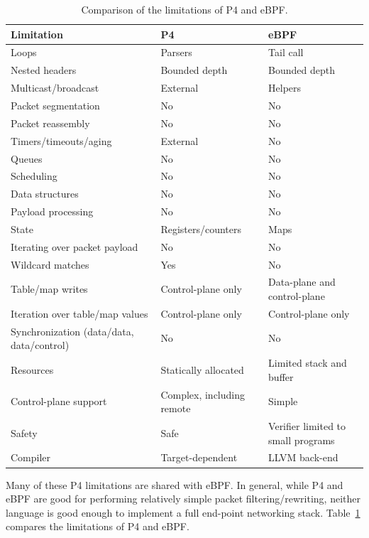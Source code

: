 \begin{table}[t]
  \footnotesize
  \begin{center}
  \begin{tabular}{|l|l|l|} \hline
    \textbf{Limitation} & \textbf{P4} & \textbf{eBPF} \\ \hline \hline
    Loops & Parsers & Tail call \\ \hline
    Nested headers & Bounded depth & Bounded depth \\ \hline
    Multicast/broadcast & External & Helpers \\ \hline
    Packet segmentation & No & No \\ \hline
    Packet reassembly &	No & No \\ \hline
    Timers/timeouts/aging & External & No \\ \hline
    Queues & No & No \\ \hline
    Scheduling & No & No \\ \hline
    Data structures & No & No \\ \hline
    Payload processing & No & No \\ \hline
    State & Registers/counters & Maps \\ \hline
    Iterating over packet payload & No & No \\ \hline
    Wildcard matches & Yes & No \\ \hline
    Table/map writes & Control-plane only & Data-plane and control-plane \\ \hline
    Iteration over table/map values & Control-plane only & Control-plane only \\ \hline
    Synchronization (data/data, data/control)  & No & No \\ \hline
    Resources & Statically allocated & Limited stack and buffer \\ \hline
    Control-plane support & Complex, including remote & Simple \\ \hline
    Safety & Safe & Verifier limited to small programs \\ \hline
    Compiler & Target-dependent & LLVM back-end \\ \hline
  \end{tabular}
  \caption{Comparison of the limitations of P4 and
    eBPF.}\label{table:limitations}
  \end{center}
\end{table}

Many of these P4 limitations are shared with eBPF.  In general, while
P4 and eBPF are good for performing relatively simple packet
filtering/rewriting, neither language is good enough to implement a
full end-point networking stack.  Table~\ref{table:limitations}
compares the limitations of P4 and eBPF.

